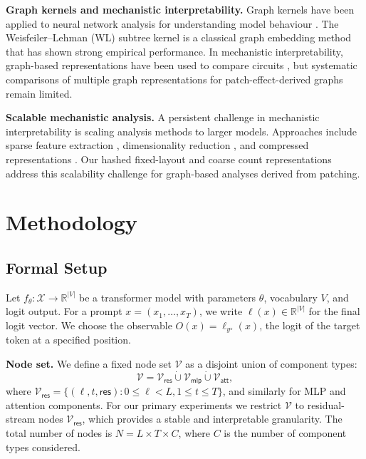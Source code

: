 \documentclass[11pt,a4paper]{article}
\newcommand{\R}{\mathbb{R}}
\newcommand{\node}{\mathcal{V}}
\newcommand{\target}{y^\star}
\begin{document}
\textbf{Graph kernels and mechanistic interpretability.} Graph kernels have been applied to neural network analysis for understanding model behaviour \cite{morris2019weisfeiler}. The Weisfeiler--Lehman (WL) subtree kernel \cite{shervashidze2011weisfeiler} is a classical graph embedding method that has shown strong empirical performance. In mechanistic interpretability, graph-based representations have been used to compare circuits \cite{nanda2023attribution}, but systematic comparisons of multiple graph representations for patch-effect-derived graphs remain limited.

\textbf{Scalable mechanistic analysis.} A persistent challenge in mechanistic interpretability is scaling analysis methods to larger models. Approaches include sparse feature extraction \cite{gupta2023sparse}, dimensionality reduction \cite{park2023causal}, and compressed representations \cite{hanna2024circuit}. Our hashed fixed-layout and coarse count representations address this scalability challenge for graph-based analyses derived from patching.

\section{Methodology}

\subsection{Formal Setup}

Let $f_\theta: \mathcal{X} \rightarrow \R^{|V|}$ be a transformer model \cite{vaswani2017attention} with parameters $\theta$, vocabulary $V$, and logit output. For a prompt $x = (x_1, \dots, x_T)$, we write $\ell(x) \in \R^{|V|}$ for the final logit vector. We choose the observable $O(x) = \ell_{\target}(x)$, the logit of the target token at a specified position.

\textbf{Node set.} We define a fixed node set $\node$ as a disjoint union of component types:
\begin{equation}
\node = \node_{\textsf{res}} \dot\cup \node_{\textsf{mlp}} \dot\cup \node_{\textsf{att}},
\end{equation}
where $\node_{\textsf{res}} = \{(\ell, t, \textsf{res}) : 0 \leq \ell < L, 1 \leq t \leq T\}$, and similarly for MLP and attention components. For our primary experiments we restrict $\node$ to residual-stream nodes $\node_{\textsf{res}}$, which provides a stable and interpretable granularity. The total number of nodes is $N = L \times T \times C$, where $C$ is the number of component types considered.
\end{document}
